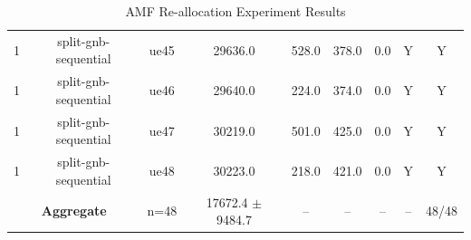 \begin{table}[ht]
\begin{tabular}{|c|c|c|c|c|c|c|c|c|}
1 & split-gnb-sequential & ue45 & 29636.0 & 528.0 & 378.0 & 0.0 & Y & Y \\
1 & split-gnb-sequential & ue46 & 29640.0 & 224.0 & 374.0 & 0.0 & Y & Y \\
1 & split-gnb-sequential & ue47 & 30219.0 & 501.0 & 425.0 & 0.0 & Y & Y \\
1 & split-gnb-sequential & ue48 & 30223.0 & 218.0 & 421.0 & 0.0 & Y & Y \\
\multicolumn{2}{|c|}{\textbf{Aggregate}} & n=48 & 17672.4 $\pm$ 9484.7 & -- & -- & -- & -- & 48/48 \\
\hline
\end{tabular}
\caption{AMF Re-allocation Experiment Results}
\label{tab:amf_realloc}
\end{table}
